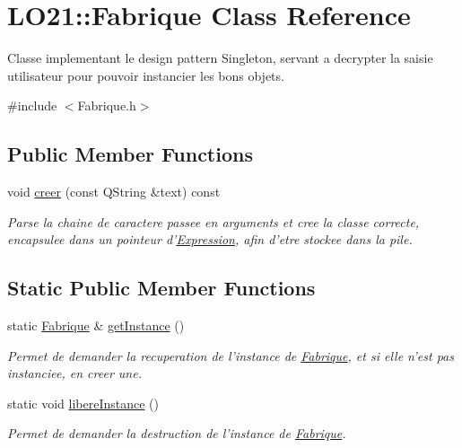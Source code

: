 \hypertarget{class_l_o21_1_1_fabrique}{\section{\-L\-O21\-:\-:\-Fabrique \-Class \-Reference}
\label{class_l_o21_1_1_fabrique}
}


\-Classe implementant le design pattern \-Singleton, servant a decrypter la saisie utilisateur pour pouvoir instancier les bons objets.  




{\ttfamily \#include $<$\-Fabrique.\-h$>$}

\subsection*{\-Public \-Member \-Functions}
\begin{DoxyCompactItemize}
\item 
void \hyperlink{class_l_o21_1_1_fabrique_ae4a3c2c0fb11aa3a90eae748888c5279}{creer} (const \-Q\-String \&text) const 
\begin{DoxyCompactList}\small\item\em \-Parse la chaine de caractere passee en arguments et cree la classe correcte, encapsulee dans un pointeur d'\hyperlink{class_l_o21_1_1_expression}{\-Expression}, afin d'etre stockee dans la pile. \end{DoxyCompactList}\end{DoxyCompactItemize}
\subsection*{\-Static \-Public \-Member \-Functions}
\begin{DoxyCompactItemize}
\item 
static \hyperlink{class_l_o21_1_1_fabrique}{\-Fabrique} \& \hyperlink{class_l_o21_1_1_fabrique_a346ae0b4a734f429f0c51bf66ad90ccb}{get\-Instance} ()
\begin{DoxyCompactList}\small\item\em \-Permet de demander la recuperation de l'instance de \hyperlink{class_l_o21_1_1_fabrique}{\-Fabrique}, et si elle n'est pas instanciee, en creer une. \end{DoxyCompactList}\item 
\hypertarget{class_l_o21_1_1_fabrique_a4abc9c9f335269ad973781cc3018be15}{static void \hyperlink{class_l_o21_1_1_fabrique_a4abc9c9f335269ad973781cc3018be15}{libere\-Instance} ()}\label{class_l_o21_1_1_fabrique_a4abc9c9f335269ad973781cc3018be15}

\begin{DoxyCompactList}\small\item\em \-Permet de demander la destruction de l'instance de \hyperlink{class_l_o21_1_1_fabrique}{\-Fabrique}. \end{DoxyCompactList}\end{DoxyCompactItemize}



